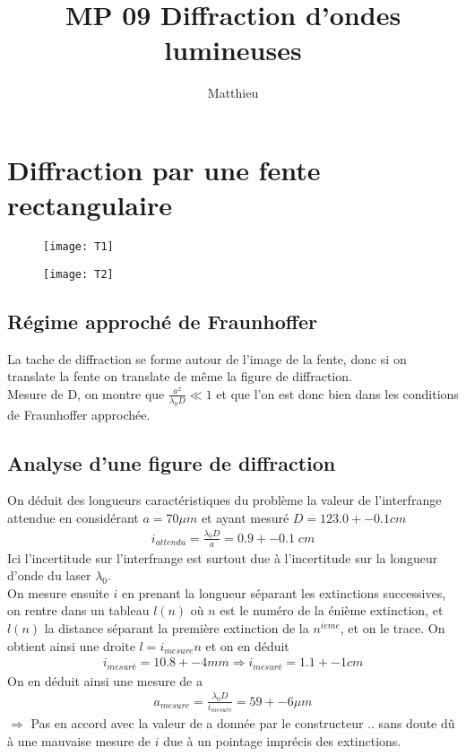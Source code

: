 \documentclass[12pt,prb,aps,epsf]{report}
\begin{document}
	
	\title{MP 09 Diffraction d'ondes lumineuses}
	\author{Matthieu}
	
	\maketitle
	
	\tableofcontents
	
	\pagebreak
	
	
\section{Diffraction par une fente rectangulaire}
\begin{figure}[h]
	\centerline{\texttt{[image: T1]}}
\end{figure}
\begin{figure}[h]
	\centerline{\texttt{[image: T2]}}
\end{figure}

\subsection{Régime approché de Fraunhoffer}
La tache de diffraction se forme autour de l'image de la fente, donc si on translate la fente on translate de même la figure de diffraction.\\
Mesure de D, on montre que $\frac{a^2}{\lambda_0 D}\ll 1$ et que l'on est donc bien dans les conditions de Fraunhoffer approchée.

\subsection{Analyse d'une figure de diffraction}
On déduit des longueurs caractéristiques du problème la valeur de l'interfrange attendue en considérant $a=70\mu m$ et ayant mesuré $D= 123.0 +-0.1 cm$
\begin{eqnarray}
i_{attendu} = \frac{\lambda_0 D }{a} = 0.9 +- 0.1\;cm
\end{eqnarray}
Ici l'incertitude sur l'interfrange est surtout due à l'incertitude sur la longueur d'onde du laser $\lambda_0$.\\
On mesure ensuite $i$ en prenant la longueur séparant les extinctions successives, on rentre dans un tableau $l(n)$ où $n$ est le numéro de la énième extinction, et $l(n)$ la distance séparant la première extinction de la $n^{ieme}$, et on le trace. On obtient ainsi une droite $l=i_{mesure} n$ et on en déduit
\begin{eqnarray}
i_{mesuré} = 10.8 +- 4 mm \Rightarrow i_{mesuré} = 1.1 +- 1 cm
\end{eqnarray}  
On en déduit ainsi une mesure de a
\begin{eqnarray}
a_{mesure} = \frac{\lambda_0 D}{i_{mesure}} = 59 +- 6 \mu m
\end{eqnarray}
$\Rightarrow $ Pas en accord avec la valeur de a donnée par le constructeur .. sans doute dû à une mauvaise mesure de $i$ due à un pointage imprécis des extinctions.
\end{document}
